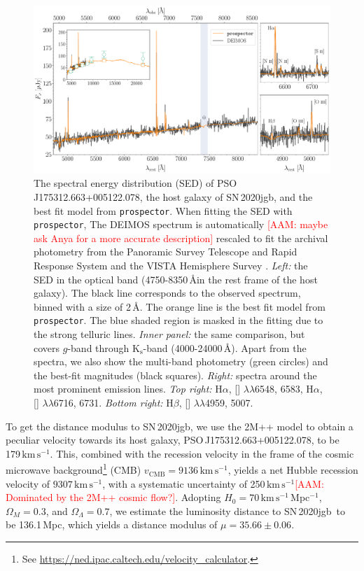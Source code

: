 \documentclass[twocolumn]{aastex631}
\newcommand{\sn}{SN\,2020jgb}
\newcommand{\kms}{$\mathrm{km}\,\mathrm{s}^{-1}$}
\newcommand{\adam}[1]{\textcolor{red}{[AAM: #1]}}
\begin{document}
\begin{figure}
    \centering
    \includegraphics[width=\textwidth]{DEIMOS_20jgb.pdf}
    \caption{The spectral energy distribution (SED) of PSO J175312.663+005122.078, the host galaxy of \sn, and the best fit model from \texttt{prospector}. When fitting the SED with \texttt{prospector}, The DEIMOS spectrum is automatically \adam{maybe ask Anya for a more accurate description} rescaled to fit the archival photometry from the Panoramic Survey Telescope and Rapid Response System \citep[Pan-STARRS;][{\it g, r, i, z, y} Kron magnitudes]{PS1_2016}  and the VISTA Hemisphere Survey \citep[VHS;][J and $\mathrm{K}_\mathrm{s}$ Petrosian magnitudes]{VHS_2013}. {\it Left:} the SED in the optical band (4750-8350\,\AA in the rest frame of the host galaxy). The black line corresponds to the observed spectrum, binned with a size of 2\,\AA. The orange line is the best fit model from \texttt{prospector}. The blue shaded region is masked in the fitting due to the strong telluric lines. {\it Inner panel:} the same comparison, but covers $g$-band through $\mathrm{K_s}$-band (4000-24000\,\AA). Apart from the spectra, we also show the multi-band photometry (green circles) and the best-fit magnitudes (black squares). {\it Right:} spectra around the most prominent emission lines. {\it Top right:} H$\alpha$, [] $\lambda\lambda$6548, 6583, H$\alpha$, [] $\lambda\lambda$6716, 6731. {\it Bottom right:} H$\beta$, [] $\lambda\lambda$4959, 5007.}
    \label{fig:host_spec}
\end{figure}

To get the distance modulus to \sn, we use the 2M++ model \citep{Carrick2015_2M++} to obtain a peculiar velocity towards its host galaxy, PSO\,J175312.663+005122.078, to be 179\,\kms. This, combined with the recession velocity in the frame of the cosmic microwave background\footnote{See \url{https://ned.ipac.caltech.edu/velocity_calculator}.} (CMB) $v_\mathrm{CMB}=9136$\,\kms, yields a net Hubble recession velocity of $9307$\,\kms, with a systematic uncertainty of 250\,\kms \adam{Dominated by the 2M++ cosmic flow?}. Adopting $H_0=70$\,\kms\,Mpc$^{-1}$, $\Omega_M=0.3$, and $\Omega_\Lambda=0.7$, we estimate the luminosity distance to \sn\ to be 136.1\,Mpc, which yields a distance modulus of $\mu=35.66\pm0.06$.
\end{document}
